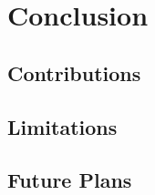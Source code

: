 \section{Conclusion}

\subsection{Contributions}

\subsection{Limitations}

\subsection{Future Plans}
